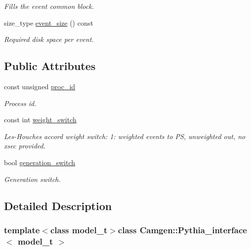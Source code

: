 \begin{DoxyCompactItemize}
\begin{DoxyCompactList}\small\item\em Fills the event common block. \end{DoxyCompactList}\item 
\hypertarget{a00448_ae0a78d3cd646f974f16f1aaae74017d4}{size\-\_\-type \hyperlink{a00448_ae0a78d3cd646f974f16f1aaae74017d4}{event\-\_\-size} () const }\label{a00448_ae0a78d3cd646f974f16f1aaae74017d4}

\begin{DoxyCompactList}\small\item\em Required disk space per event. \end{DoxyCompactList}\end{DoxyCompactItemize}
\subsection*{Public Attributes}
\begin{DoxyCompactItemize}
\item 
\hypertarget{a00448_a92336d3949758f6ebb7b07c44949a075}{const unsigned \hyperlink{a00448_a92336d3949758f6ebb7b07c44949a075}{proc\-\_\-id}}\label{a00448_a92336d3949758f6ebb7b07c44949a075}

\begin{DoxyCompactList}\small\item\em Process id. \end{DoxyCompactList}\item 
const int \hyperlink{a00448_a75fd3fbc4856898df3bcf66530af81e0}{weight\-\_\-switch}
\begin{DoxyCompactList}\small\item\em Les-\/\-Houches accord weight switch\-: 1\-: weighted events to P\-S, unweighted out, no xsec provided. \end{DoxyCompactList}\item 
bool \hyperlink{a00448_a5ecb4d493254caf2ae844b3b6a982671}{generation\-\_\-switch}
\begin{DoxyCompactList}\small\item\em Generation switch. \end{DoxyCompactList}\end{DoxyCompactItemize}


\subsection{Detailed Description}
\subsubsection*{template$<$class model\-\_\-t$>$class Camgen\-::\-Pythia\-\_\-interface$<$ model\-\_\-t $>$}

